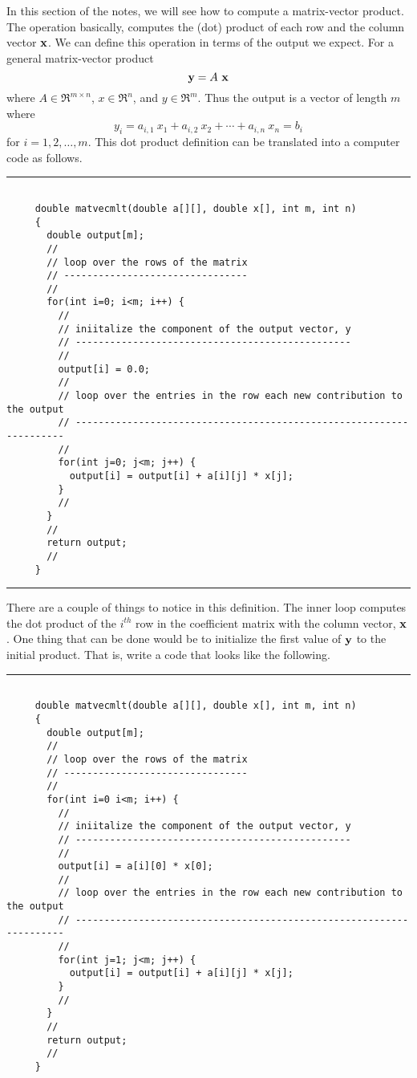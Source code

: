 \documentclass[10pt,fleqn]{article}
\begin{document}
In this section of the notes, we will see how to compute a matrix-vector
product. The operation basically, computes the (dot) product of each row and the
column vector ${\bf x}$. We can define this operation in terms of the output we
expect. For a general matrix-vector product
$$
  {\bf y} = A\ {\bf x}
$$
where $A\in\Re^{m\times n}$, $x\in\Re^n$, and $y\in\Re^m$. Thus the output is a
vector of length $m$ where
$$
  y_i = a_{i,1}\ x_1 + a_{i,2}\ x_2 + \cdots + a_{i,n}\ x_n = b_i
$$
for $i=1,2,\ldots,m$. This dot product definition can be translated into a
computer code as follows.
\vskip0.1in\hrule\vskip0.1in
\begin{verbatim}

     double matvecmlt(double a[][], double x[], int m, int n)
     {
       double output[m];
       //
       // loop over the rows of the matrix
       // --------------------------------
       //
       for(int i=0; i<m; i++) {
         //
         // iniitalize the component of the output vector, y
         // ------------------------------------------------
         //
         output[i] = 0.0;
         //
         // loop over the entries in the row each new contribution to the output
         // --------------------------------------------------------------------
         //
         for(int j=0; j<m; j++) {
           output[i] = output[i] + a[i][j] * x[j];
         }
         //
       }
       //
       return output;
       //
     }

\end{verbatim}
\vskip0.1in\hrule\vskip0.1in
\noindent
There are a couple of things to notice in this definition. The inner loop
computes the dot product of the $i^{th}$ row in the coefficient matrix with the
column vector, ${\bf x}$. One thing that can be done would be to initialize the
first value of ${\bf y}$ to the initial product. That is, write a code that
looks like the following.
\vskip0.1in\hrule\vskip0.1in
\begin{verbatim}

     double matvecmlt(double a[][], double x[], int m, int n)
     {
       double output[m];
       //
       // loop over the rows of the matrix
       // --------------------------------
       //
       for(int i=0 i<m; i++) {
         //
         // iniitalize the component of the output vector, y
         // ------------------------------------------------
         //
         output[i] = a[i][0] * x[0];
         //
         // loop over the entries in the row each new contribution to the output
         // --------------------------------------------------------------------
         //
         for(int j=1; j<m; j++) {
           output[i] = output[i] + a[i][j] * x[j];
         }
         //
       }
       //
       return output;
       //
     }

\end{verbatim}
\end{document}

